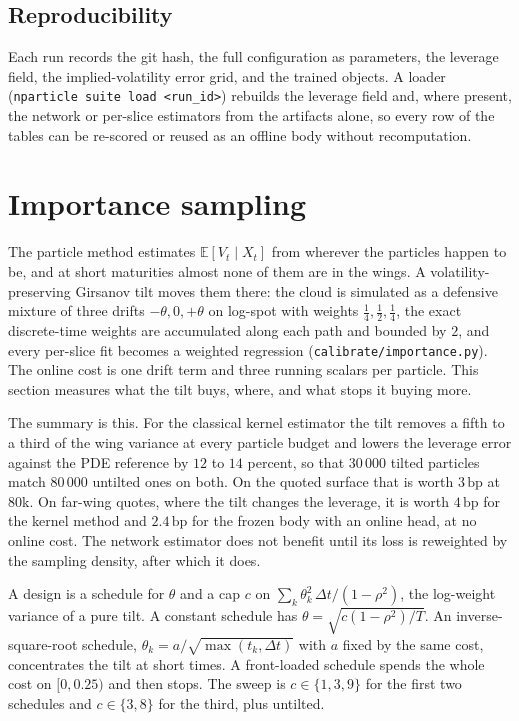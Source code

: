 \documentclass[11pt,a4paper]{article}
\newcommand{\E}{\mathbb{E}}
\newcommand{\bp}{\,\mathrm{bp}}
\newcommand{\code}[1]{\texttt{#1}}
\begin{document}
\subsection{Reproducibility}\label{sec:suite-repro}

Each run records the git hash, the full configuration as parameters, the leverage field, the implied-volatility error grid, and the trained objects. A loader (\code{nparticle suite load <run\_id>}) rebuilds the leverage field and, where present, the network or per-slice estimators from the artifacts alone, so every row of the tables can be re-scored or reused as an offline body without recomputation.

\section{Importance sampling}\label{sec:tilt}

The particle method estimates $\E[V_t\mid X_t]$ from wherever the particles happen to be, and at short maturities almost none of them are in the wings. A volatility-preserving Girsanov tilt moves them there: the cloud is simulated as a defensive mixture of three drifts $-\theta,0,+\theta$ on log-spot with weights $\tfrac14,\tfrac12,\tfrac14$, the exact discrete-time weights are accumulated along each path and bounded by $2$, and every per-slice fit becomes a weighted regression (\code{calibrate/importance.py}). The online cost is one drift term and three running scalars per particle. This section measures what the tilt buys, where, and what stops it buying more.

The summary is this. For the classical kernel estimator the tilt removes a fifth to a third of the wing variance at every particle budget and lowers the leverage error against the PDE reference by $12$ to $14$ percent, so that $30\,000$ tilted particles match $80\,000$ untilted ones on both. On the quoted surface that is worth $3\bp$ at $80$k. On far-wing quotes, where the tilt changes the leverage, it is worth $4\bp$ for the kernel method and $2.4\bp$ for the frozen body with an online head, at no online cost. The network estimator does not benefit until its loss is reweighted by the sampling density, after which it does.

A design is a schedule for $\theta$ and a cap $c$ on $\sum_k\theta_k^2\,\Delta t/(1-\rho^2)$, the log-weight variance of a pure tilt. A constant schedule has $\theta=\sqrt{c(1-\rho^2)/T}$. An inverse-square-root schedule, $\theta_k=a/\sqrt{\max(t_k,\Delta t)}$ with $a$ fixed by the same cost, concentrates the tilt at short times. A front-loaded schedule spends the whole cost on $[0,0.25)$ and then stops. The sweep is $c\in\{1,3,9\}$ for the first two schedules and $c\in\{3,8\}$ for the third, plus untilted.
\end{document}
